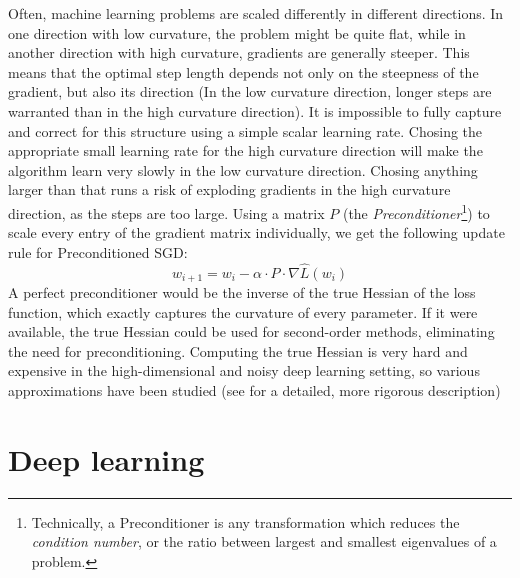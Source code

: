 \documentclass[twoside,12pt,a4paper]{report}
\begin{document}
Often, machine learning problems are scaled differently in different directions. In one direction with low curvature, the problem might be quite flat, while in another direction with high curvature, gradients are generally steeper. This means that the optimal step length depends not only on the steepness of the gradient, but also its direction (In the low curvature direction, longer steps are warranted than in the high curvature direction).
It is impossible to fully capture and correct for this structure using a simple scalar learning rate. Chosing the appropriate small learning rate for the high curvature direction will make the algorithm learn very slowly in the low curvature direction. Chosing anything larger than that runs a risk of exploding gradients in the high curvature direction, as the steps are too large.
Using a matrix $P$ (the \textit{Preconditioner}\footnote{Technically, a Preconditioner is any transformation which reduces the \textit{condition number}, or the ratio between largest and smallest eigenvalues of a problem.}) to scale every entry of the gradient matrix individually, we get the following update rule for Preconditioned SGD:
$$w_{i+1} = w_i - \alpha \cdot P \cdot \nabla \hat{L}(w_i) $$
A perfect preconditioner would be the inverse of the true Hessian of the loss function, which exactly captures the curvature of every parameter. If it were available, the true Hessian could be used for second-order methods, eliminating the need for preconditioning.
Computing the true Hessian is very hard and expensive in the high-dimensional and noisy deep learning setting, so various approximations have been studied (see \cite{saad2003iterative} for a detailed, more rigorous description)

\section{Deep learning}
\end{document}

